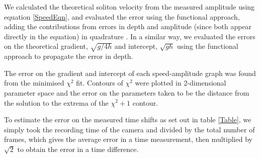 \documentclass[10pt, twocolumn]{revtex4}    %
\begin{document}
We calculated the theoretical soliton velocity from the measured amplitude using equation \ref{SpeedEqn}, and evaluated the error using the functional approach, adding the contributions from errors in depth and amplitude (since both appear directly in the equation) in quadrature \cite{Hughes}. In a similar way, we evaluated the errors on the theoretical gradient, $\sqrt{g/4h}$ and intercept, $\sqrt{gh}$ using the functional approach to propagate the error in depth. 

The error on the gradient and intercept of each speed-amplitude graph was found from the minimised $\chi^2$ fit. Contours of $\chi^2$ were plotted in 2-dimensional parameter space and the error on the parameters taken to be the distance from the solution to the extrema of the $\chi^2+1$ contour. 

To estimate the error on the measured time shifts as set out in table \ref{Table}, we simply took the recording time of the camera and divided by the total number of frames, which gives the average error in a time measurement, then multiplied by $\sqrt{2}$ to obtain the error in a time difference. 
\end{document}
